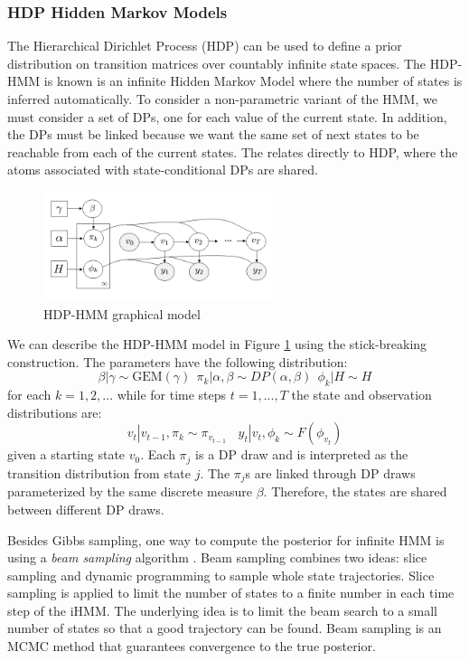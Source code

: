 \subsubsection{HDP Hidden Markov Models}

The Hierarchical Dirichlet Process (HDP) can be used to define a prior distribution on transition matrices over countably infinite state spaces. The HDP-HMM is known is an infinite Hidden Markov Model where the number of states is inferred automatically. To consider a non-parametric variant of the HMM, we must consider a set of DPs, one for each value of the current state. In addition, the DPs must be linked because we want the same set of next states to be reachable from each of the current states. The relates directly to HDP, where the atoms associated with state-conditional DPs are shared.

\begin{figure}[thpb]
    \centering
    \includegraphics[width=0.6\textwidth, trim={10 10 10 10}]{figures/hdp_hmm_gm.png}
    \caption{HDP-HMM graphical model}
    \label{fig:hdp_hmm_gm}
\end{figure}

We can describe the HDP-HMM model in Figure \ref{fig:hdp_hmm_gm} using the stick-breaking construction. The parameters have the following distribution:
\begin{equation}
    \beta|\gamma \sim \mathrm{GEM}(\gamma) ~~ \pi_k|\alpha,\beta \sim DP(\alpha,\beta) ~~ \phi_k|H \sim H
\end{equation}
for each $k=1,2,...$ while for time steps $t=1,...,T$ the state and observation distributions are:
\begin{equation}
    v_t|v_{t-1}, \pi_k \sim \pi_{v_{t-1}} ~~~~ y_t|v_{t},\phi_k \sim F(\phi_{v_t})
\end{equation}
given a starting state $v_0$. Each $\pi_j$ is a DP draw and is interpreted as the transition distribution from state $j$. The $\pi_j$s are linked through DP draws parameterized by the same discrete measure $\beta$. Therefore, the states are shared between different DP draws. 

Besides Gibbs sampling, one way to compute the posterior for infinite HMM is using a \textit{beam sampling} algorithm \cite{VanSaaTeh2008a}. Beam sampling combines two ideas: slice sampling and dynamic programming to sample whole state trajectories. Slice sampling is applied to limit the number of states to a finite number in each time step of the iHMM. The underlying idea is to limit the beam search to a small number of states so that a good trajectory can be found. Beam sampling is an MCMC method that guarantees convergence to the true posterior.\\

